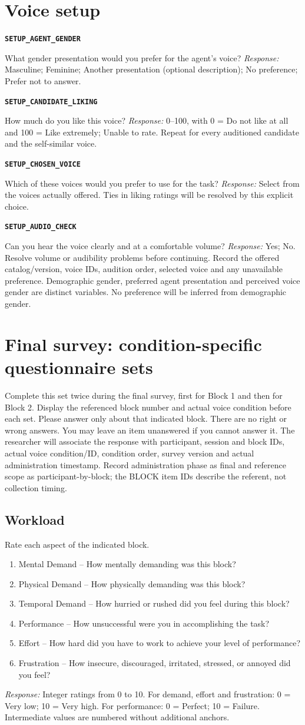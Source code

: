 \documentclass[11pt,letterpaper]{article}
\newcommand{\qid}[1]{\par\smallskip\textbf{\texttt{#1}}\par}
\begin{document}
\section{Voice setup}
\qid{SETUP\_AGENT\_GENDER}
What gender presentation would you prefer for the agent's voice?
\textit{Response:} Masculine; Feminine; Another presentation (optional description); No preference; Prefer not to answer.
\qid{SETUP\_CANDIDATE\_LIKING}
How much do you like this voice?
\textit{Response:} 0--100, with 0 = Do not like at all and 100 = Like extremely; Unable to rate. Repeat for every auditioned candidate and the self-similar voice.
\qid{SETUP\_CHOSEN\_VOICE}
Which of these voices would you prefer to use for the task?
\textit{Response:} Select from the voices actually offered. Ties in liking ratings will be resolved by this explicit choice.
\qid{SETUP\_AUDIO\_CHECK}
Can you hear the voice clearly and at a comfortable volume?
\textit{Response:} Yes; No. Resolve volume or audibility problems before continuing.
Record the offered catalog/version, voice IDs, audition order, selected voice and any unavailable preference. Demographic gender, preferred agent presentation and perceived voice gender are distinct variables. No preference will be inferred from demographic gender.
\clearpage\section{Final survey: condition-specific questionnaire sets}
Complete this set twice during the final survey, first for Block 1 and then for Block 2. Display the referenced block number and actual voice condition before each set. Please answer only about that indicated block. There are no right or wrong answers. You may leave an item unanswered if you cannot answer it.
The researcher will associate the response with participant, session and block IDs, actual voice condition/ID, condition order, survey version and actual administration timestamp. Record administration phase as final and reference scope as participant-by-block; the BLOCK item IDs describe the referent, not collection timing.
\subsection{Workload}
Rate each aspect of the indicated block.
\begin{enumerate}
\item Mental Demand -- How mentally demanding was this block?
\item Physical Demand -- How physically demanding was this block?
\item Temporal Demand -- How hurried or rushed did you feel during this block?
\item Performance -- How unsuccessful were you in accomplishing the task?
\item Effort -- How hard did you have to work to achieve your level of performance?
\item Frustration -- How insecure, discouraged, irritated, stressed, or annoyed did you feel?
\end{enumerate}
\textit{Response:} Integer ratings from 0 to 10. For demand, effort and frustration: 0 = Very low; 10 = Very high. For performance: 0 = Perfect; 10 = Failure. Intermediate values are numbered without additional anchors.
\end{document}
